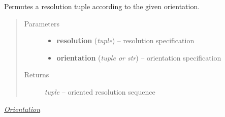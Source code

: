 \documentclass[letterpaper,10pt,english]{sphinxmanual}
\begin{document}

\begin{fulllineitems}
\label{api/ClearMap.Alignment:ClearMap.Alignment.Resampling.orientResolution}
Permutes a resolution tuple according to the given orientation.
\begin{quote}\begin{description}
\item[{Parameters}] \leavevmode\begin{itemize}
\item {} 
\textbf{resolution} (\emph{tuple}) --
resolution specification

\item {} 
\textbf{orientation} (\emph{tuple or str}) --
orientation specification

\end{itemize}

\item[{Returns}] \leavevmode
\emph{tuple} --
oriented resolution sequence

\end{description}\end{quote}




{\hyperref[api/ClearMap.Alignment:orientation]{\emph{Orientation}}}



\end{fulllineitems}

\end{document}
